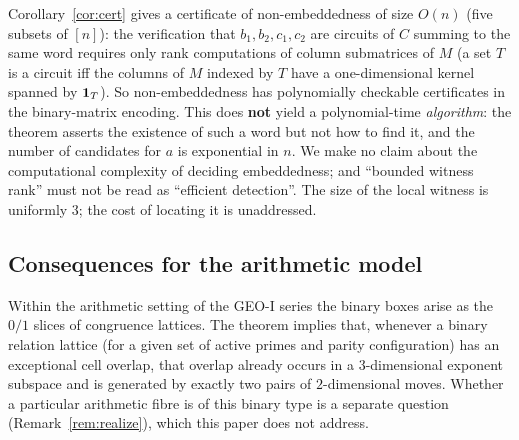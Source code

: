 \begin{remark}\label{rem:algo}
Corollary~\ref{cor:cert} gives a certificate of non-embeddedness of size $O(n)$ (five subsets of $[n]$): the verification that $b_1,b_2,c_1,c_2$ are circuits of $C$ summing to the same word requires only rank computations of column submatrices of $M$ (a set $T$ is a circuit iff the columns of $M$ indexed by $T$ have a one-dimensional kernel spanned by $\mathbf 1_T$). So non-embeddedness has polynomially checkable certificates in the binary-matrix encoding. This does \textbf{not} yield a polynomial-time \emph{algorithm}: the theorem asserts the existence of such a word but not how to find it, and the number of candidates for $a$ is exponential in $n$. We make no claim about the computational complexity of deciding embeddedness; and ``bounded witness rank'' must not be read as ``efficient detection''. The size of the local witness is uniformly $3$; the cost of locating it is unaddressed.
\end{remark}

\subsection{Consequences for the arithmetic model}

Within the arithmetic setting of the GEO-I series the binary boxes arise as the $0/1$ slices of congruence lattices. The theorem implies that, whenever a binary relation lattice (for a given set of active primes and parity configuration) has an exceptional cell overlap, that overlap already occurs in a $3$-dimensional exponent subspace and is generated by exactly two pairs of $2$-dimensional moves. Whether a particular arithmetic fibre is of this binary type is a separate question (Remark~\ref{rem:realize}), which this paper does not address.
